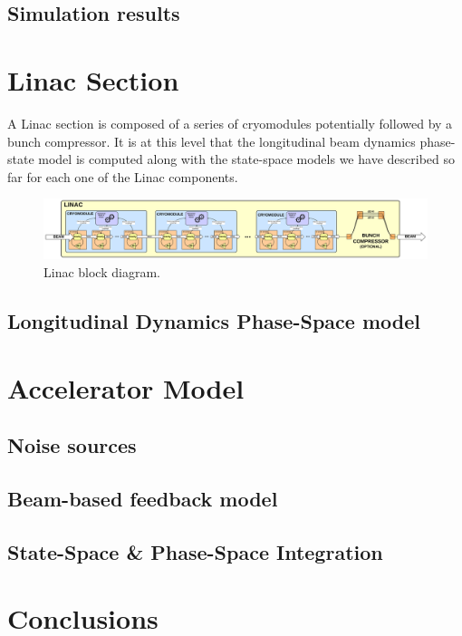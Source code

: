 \documentclass[a4paper,12pt]{article}
\begin{document}
\subsection{Simulation results}

\newpage

\section{Linac Section}

A Linac section is composed of a series of cryomodules potentially followed by a bunch compressor. It is at this level that the longitudinal beam dynamics phase-state model is computed along with the state-space models we have described so far for each one of the Linac components.

\begin{figure}
\centering
\includegraphics[scale=0.45]{../figures/Linac_block_diagram.png}
\caption{Linac block diagram.}
\label{fig:Linac_block_diagram}
\end{figure}

\subsection{Longitudinal Dynamics Phase-Space model}

\section{Accelerator Model}

\subsection{Noise sources}
\subsection{Beam-based feedback model}
\subsection{State-Space \& Phase-Space Integration}


\section{Conclusions}
\end{document}
